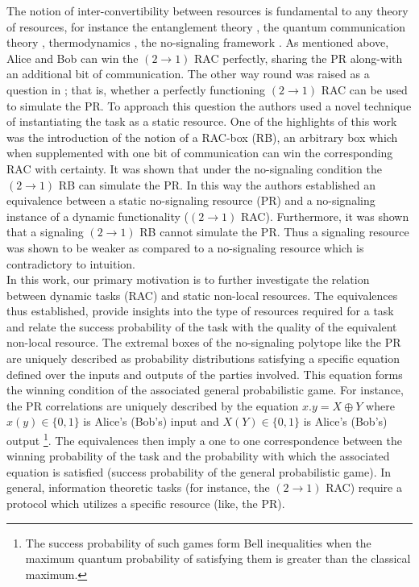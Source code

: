 \documentclass[%
 reprint,
 amsmath,amssymb,
 aps,
]{revtex4-1}
\begin{document}
The notion of inter-convertibility between resources is fundamental to any theory of resources, for instance the entanglement theory  \cite{bennett1996concentrating,horodecki2002laws,brandao2008entanglement}, the quantum communication theory \cite{abeyesinghe2009mother}, thermodynamics \cite{janzing2000thermodynamic,horodecki2013fundamental,brandao2013resource}, the no-signaling framework \cite{allcock2009closed,brunner2011bound}. As mentioned above, Alice and Bob can win the $(2\rightarrow1)$ RAC perfectly, sharing the PR along-with an additional bit of communication.  
The other way round was raised as a question in \cite{grudka2014popescu}; that is, whether a perfectly functioning $(2\rightarrow1)$ RAC can be used to simulate the PR. To approach this question the authors used a novel technique of instantiating the task as a static resource. One of the highlights of this work was the introduction of the notion of a  RAC-box (RB), an arbitrary box which when supplemented with one bit of communication can win the corresponding RAC with certainty. It was shown that under the no-signaling condition the $(2\rightarrow1)$ RB can simulate the PR. 
In this way the authors established an equivalence between a static no-signaling resource (PR) and a no-signaling instance of a dynamic functionality ($(2\rightarrow1)$ RAC). Furthermore, it was shown that a signaling $(2\rightarrow1)$ RB cannot simulate the PR. Thus a signaling resource was shown to be weaker as compared to a no-signaling resource which is contradictory to intuition. \\ 
In this work, our primary motivation is to further investigate the relation between dynamic tasks (RAC) and static non-local resources. The equivalences thus established, provide insights into the type of resources required for a task and relate the success probability of the task with the quality of the equivalent non-local resource. The extremal boxes of the no-signaling polytope like the PR are uniquely described as probability distributions satisfying a specific equation defined over the inputs and outputs of the parties involved. This equation forms the winning condition of the associated general probabilistic game. For instance, the PR correlations are uniquely described by the equation $x.y=X\oplus Y$ where $x(y)\in \{0,1\}$ is Alice's (Bob's) input and $X(Y) \in \{0,1\}$ is Alice's (Bob's) output \footnote{The success probability of such games form Bell inequalities when the maximum quantum probability of satisfying them is greater than the classical maximum.}.
The equivalences then imply a one to one correspondence between the winning probability of the task and the probability with which the associated equation is satisfied (success probability of the general probabilistic game). In general, information theoretic tasks (for instance, the $(2 \rightarrow 1)$ RAC) require a protocol which utilizes a specific resource (like, the PR). 
\end{document}
